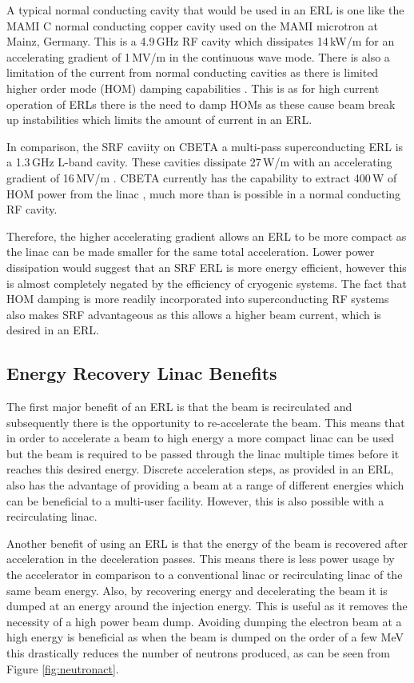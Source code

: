 \documentclass[11pt]{article}
\begin{document}
A typical normal conducting cavity that would be used in an ERL is one like the MAMI C normal conducting copper cavity used on the MAMI microtron \cite{MAMImicro} at Mainz, Germany. This is a 4.9\,GHz RF cavity which dissipates 14\,kW/m for an accelerating gradient of 1\,MV/m \cite{MAMICrf} in the continuous wave mode. There is also a limitation of the current from normal conducting cavities as there is limited higher order mode (HOM) damping capabilities \cite{CASERL}. This is as for high current operation of ERLs there is the need to damp HOMs as these cause beam break up instabilities \cite{HoffstaetterBBU} which limits the amount of current in an ERL. 

In comparison, the SRF caviity on CBETA \cite{IPAC2018CBETA} a multi-pass superconducting ERL is a 1.3\,GHz L-band cavity. These cavities dissipate 27\,W/m with an accelerating gradient of 16\,MV/m \cite{CBETATDR}. CBETA currently has the capability to extract 400\,W of HOM power from the linac \cite{CBETATDR}, much more than is possible in a normal conducting RF cavity.

Therefore, the higher accelerating gradient allows an ERL to be more compact as the linac can be made smaller for the same total acceleration. Lower power dissipation would suggest that an SRF ERL is more energy efficient, however this is almost completely negated by the efficiency of cryogenic systems. The fact that HOM damping is more readily incorporated into superconducting RF systems also makes SRF advantageous as this allows a higher beam current, which is desired in an ERL.

\subsection{Energy Recovery Linac Benefits}

The first major benefit of an ERL is that the beam is recirculated and subsequently there is the opportunity to re-accelerate the beam. This means that in order to accelerate a beam to high energy a more compact linac can be used but the beam is required to be passed through the linac multiple times before it reaches this desired energy. Discrete acceleration steps, as provided in an ERL, also has the advantage of providing a beam at a range of different energies which can be beneficial to a multi-user facility. However, this is also possible with a recirculating linac.

Another benefit of using an ERL is that the energy of the beam is recovered after acceleration in the deceleration passes. This means there is less power usage by the accelerator in comparison to a conventional linac or recirculating linac of the same beam energy. Also, by recovering energy and decelerating the beam it is dumped at an energy around the injection energy. This is useful as it removes the necessity of a high power beam dump. Avoiding dumping the electron beam at a high energy is beneficial as when the beam is dumped on the order of a few MeV this drastically reduces the number of neutrons produced, as can be seen from Figure \ref{fig:neutronact}.
\end{document}

